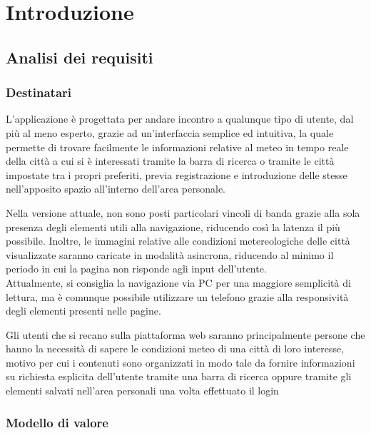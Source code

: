 \chapter{Introduzione}

\section{Analisi dei requisiti}

\subsection{Destinatari}

L'applicazione è progettata per andare incontro a qualunque tipo di utente, dal più al meno esperto, grazie ad 
un'interfaccia semplice ed intuitiva, la quale permette di trovare facilmente le informazioni relative al meteo in tempo reale 
della città a cui si è interessati tramite la barra di ricerca o tramite le città impostate tra i propri preferiti, previa 
registrazione e introduzione delle stesse nell'apposito spazio all'interno dell'area personale.

\vspace{5mm}

Nella versione attuale, non sono posti particolari vincoli di banda grazie alla sola presenza degli elementi utili alla 
navigazione, riducendo così la latenza il più possibile. Inoltre, le immagini relative alle condizioni metereologiche delle città 
visualizzate saranno caricate in modalità asincrona, riducendo al minimo il periodo in cui la pagina non risponde agli input 
dell'utente.\\
Attualmente, si consiglia la navigazione via PC per una maggiore semplicità di lettura, ma è comunque possibile utilizzare un 
telefono grazie alla responsività degli elementi presenti nelle pagine.

\vspace{5mm}

Gli utenti che si recano sulla piattaforma web saranno principalmente persone che hanno la necessità di sapere le condizioni 
meteo di una città di loro interesse, motivo per cui i contenuti sono organizzati in modo tale da fornire informazioni su 
richiesta esplicita dell'utente tramite una barra di ricerca oppure tramite gli elementi salvati nell'area personali una volta 
effettuato il login


\subsection{Modello di valore}

